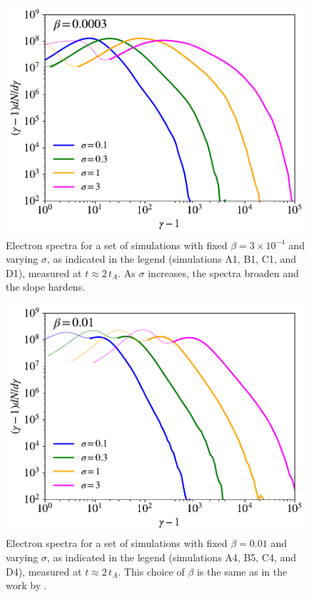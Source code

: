 \begin{figure}[!h]
	\centering
	\includegraphics[width =\textwidth]{beta_0003_sigmas_withcold.pdf}
	\caption{Electron spectra for a set of simulations with fixed $\beta=3\times 10^{-4}$ and varying $\sigma$, as indicated in the legend (simulations A1, B1, C1, and D1), measured at $t\approx 2\,t_{A}$.  As $\sigma$ increases, the spectra broaden and the slope hardens.}
    \label{beta0003_spec}
\end{figure}

\begin{figure}[!h]
	\centering
	\includegraphics[width =\textwidth]{beta_01_sigmas_withcold.pdf}
	\caption{Electron spectra for a set of simulations with fixed $\beta=0.01$ and varying $\sigma$, as indicated in the legend (simulations A4, B5, C4, and D4), measured at $t\approx 2\,t_{A}$. This choice of $\beta$ is the same as in the work by  \citet{werner2018}.}
    \label{beta01_spec}
\end{figure}

